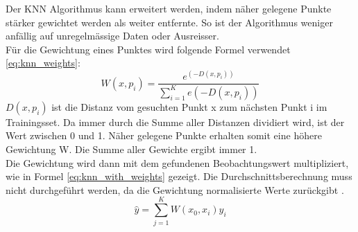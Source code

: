 %
Der KNN Algorithmus kann erweitert werden, indem näher gelegene Punkte stärker gewichtet werden als weiter entfernte. So ist der Algorithmus weniger anfällig auf unregelmässige Daten oder Ausreisser.\\
Für die Gewichtung eines Punktes wird folgende Formel verwendet \eqref{eq:knn_weights}:
\begin{equation}
\label{eq:knn_weights}
W(x, p_i) = \frac{e^{(-D(x, p_i))}}{\sum_{i=1}^{K} e(-D(x, p_i))}
\end{equation}
%
$D(x, p_i)$ ist die Distanz vom gesuchten Punkt x zum nächsten Punkt i im Trainingsset. Da immer durch die Summe aller Distanzen dividiert wird, ist der Wert zwischen 0 und 1. Näher gelegene Punkte erhalten somit eine höhere Gewichtung W. Die Summe aller Gewichte ergibt immer 1.\\
Die Gewichtung wird dann mit dem gefundenen Beobachtungswert multipliziert, wie in Formel \eqref{eq:knn_with_weights} gezeigt. Die Durchschnittsberechnung muss nicht durchgeführt werden, da die Gewichtung normalisierte Werte zurückgibt \cite{knn_2, knn_3}.
\begin{equation}
\label{eq:knn_with_weights}
\hat{y} = \sum_{j=1}^{K} W(x_0, x_i) y_i
\end{equation}
%
%
